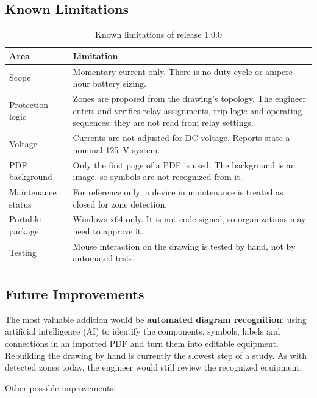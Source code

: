 \subsection{Known Limitations}

\begin{table}[H]
  \centering
  \caption{Known limitations of release 1.0.0}
  \label{tab:limitations}
  \begin{tabularx}{\textwidth}{l L}
    \toprule
    \textbf{Area} & \textbf{Limitation} \\
    \midrule
    Scope & Momentary current only. There is no duty-cycle or ampere-hour battery sizing. \\
    Protection logic & Zones are proposed from the drawing's topology. The engineer enters and verifies relay assignments, trip logic and operating sequences; they are not read from relay settings. \\
    Voltage & Currents are not adjusted for DC voltage. Reports state a nominal \SI{125}{V} system. \\
    PDF background & Only the first page of a PDF is used. The background is an image, so symbols are not recognized from it. \\
    Maintenance status & For reference only; a device in maintenance is treated as closed for zone detection. \\
    Portable package & Windows x64 only. It is not code-signed, so organizations may need to approve it. \\
    Testing & Mouse interaction on the drawing is tested by hand, not by automated tests. \\
    \bottomrule
  \end{tabularx}
\end{table}

\subsection{Future Improvements}

The most valuable addition would be \textbf{automated diagram recognition}: using
artificial intelligence (AI) to identify the components, symbols, labels and
connections in an imported PDF and turn them into editable equipment. Rebuilding the
drawing by hand is currently the slowest step of a study. As with detected zones
today, the engineer would still review the recognized equipment.

Other possible improvements:

